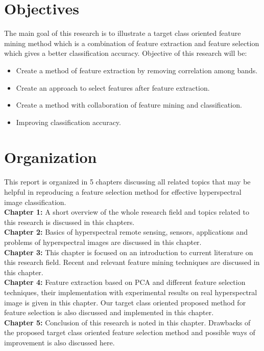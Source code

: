 \documentclass[document.tex]{subfiles}
\begin{document}
\section{Objectives}
\noindent The main goal of this research is to illustrate a target class oriented feature mining method which is a combination of feature extraction and feature selection which gives a better classification accuracy. 
Objective of this research will be:
\begin{itemize}
	\item Create a method of feature extraction by removing correlation among bands.
	\item Create an approach to select features after feature extraction.
	\item Create a method with collaboration of feature mining and classification.
	\item Improving classification accuracy.
\end{itemize}

\section{Organization}
\noindent This report is organized in 5 chapters discussing all related topics that may be helpful in reproducing a feature selection method for effective hyperspectral image classification.\\
\textbf{Chapter 1: } A short overview of the whole research field and topics related to this research is discussed in this chapters.\\
\textbf{Chapter 2: } Basics of hyperspectral remote sensing, sensors, applications and problems of hyperspectral images are discussed in this chapter. \\
\textbf{Chapter 3: } This chapter is focused on an introduction to current literature on this research field. Recent and relevant feature mining techniques are discussed in this chapter.\\
\textbf{Chapter 4: } Feature extraction based on PCA and different feature selection techniques, their implementation with experimental results on real hyperspectral image is given in this chapter. Our target class oriented proposed method for feature selection is also discussed and implemented in this chapter.\\ 
\textbf{Chapter 5: } Conclusion of this research is noted in this chapter. Drawbacks of the proposed target class oriented feature selection method and possible ways of improvement is also discussed here.\\
 
\end{document}
